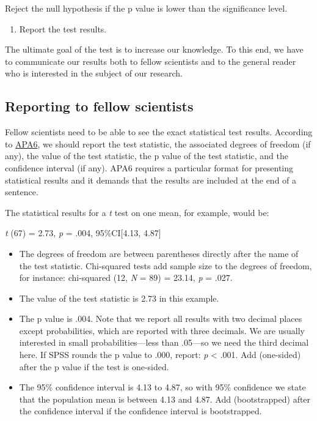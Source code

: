 \documentclass[a4paper]{book}
\providecommand{\tightlist}{%
  \setlength{\itemsep}{0pt}\setlength{\parskip}{0pt}}
\theoremstyle{definition}
\theoremstyle{definition}
\theoremstyle{definition}
\theoremstyle{remark}
\begin{document}
Reject the null hypothesis if the p value is lower than the significance
level.

\begin{enumerate}
\def\labelenumi{\arabic{enumi}.}
\setcounter{enumi}{5}
\tightlist
\item
  Report the test results.
\end{enumerate}

The ultimate goal of the test is to increase our knowledge. To this end,
we have to communicate our results both to fellow scientists and to the
general reader who is interested in the subject of our research.

\subsection{Reporting to fellow
scientists}\label{reporting-to-fellow-scientists}

Fellow scientists need to be able to see the exact statistical test
results. According to \href{http://www.apastyle.org/}{APA6}, we should
report the test statistic, the associated degrees of freedom (if any),
the value of the test statistic, the p value of the test statistic, and
the confidence interval (if any). APA6 requires a particular format for
presenting statistical results and it demands that the results are
included at the end of a sentence.

The statistical results for a \emph{t} test on one mean, for example,
would be:

\emph{t} (67) = 2.73, \emph{p} = .004, 95\%CI{[}4.13, 4.87{]}

\begin{itemize}
\item
  The degrees of freedom are between parentheses directly after the name
  of the test statistic. Chi-squared tests add sample size to the
  degrees of freedom, for instance: chi-squared (12, \emph{N} = 89) =
  23.14, \emph{p} = .027.
\item
  The value of the test statistic is 2.73 in this example.
\item
  The p value is .004. Note that we report all results with two decimal
  places except probabilities, which are reported with three decimals.
  We are usually interested in small probabilities---less than .05---so
  we need the third decimal here. If SPSS rounds the p value to .000,
  report: \emph{p} \textless{} .001. Add (one-sided) after the p value
  if the test is one-sided.
\item
  The 95\% confidence interval is 4.13 to 4.87, so with 95\% confidence
  we state that the population mean is between 4.13 and 4.87. Add
  (bootstrapped) after the confidence interval if the confidence
  interval is bootstrapped.
\end{itemize}
\end{document}
